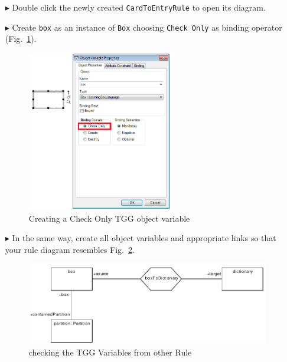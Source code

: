 \begin{enumerate}
\item[$\blacktriangleright$] Double click the newly created \texttt{CardToEntryRule} to open its diagram.
\item[$\blacktriangleright$] Create \texttt{box} as an instance of \texttt{Box} choosing \texttt{Check Only} as binding operator (Fig.~\ref{fig:bound_tgg_variable}).

\begin{figure}[htbp]
\begin{center}
  \includegraphics[width=0.6\textwidth]{pics/tggBilder/tggRule/tgg17}
  \caption{Creating a Check Only TGG object variable}  
  \label{fig:bound_tgg_variable}
\end{center}
\end{figure}

\item[$\blacktriangleright$] In the same way, create all object variables and appropriate links so that your rule diagram resembles Fig.~\ref{fig:check_bound_variables}.

\begin{figure}[htbp]
\begin{center}
  \includegraphics[width=\textwidth]{pics/tggBilder/tggRule/tgg18}
  \caption{checking the TGG Variables from other Rule }  
  \label{fig:check_bound_variables}
\end{center}
\end{figure}

\end{enumerate}

